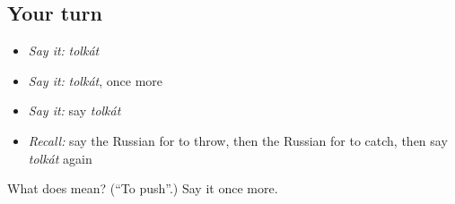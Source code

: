 \subsection*{Your turn}
\begin{itemize}
\raggedright
  \item \emph{Say it:} \emph{tolkát}
  \item \emph{Say it:} \emph{tolkát}, once more
  \item \emph{Say it:} say \emph{tolkát}
  \item \emph{Recall:} say the Russian for to throw, then the Russian for to catch, then say \emph{tolkát} again
\end{itemize}

\begin{tcolorbox}[breakable,colback=teal!4,colframe=teal!35!black,title={Before you move on}]
What does  mean? (\textquotedblleft{}To push\textquotedblright{}.) Say it once more.
\end{tcolorbox}
